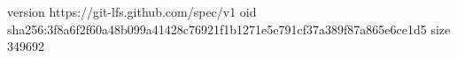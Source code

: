 version https://git-lfs.github.com/spec/v1
oid sha256:3f8a6f2f60a48b099a41428c76921f1b1271e5e791cf37a389f87a865e6ce1d5
size 349692
